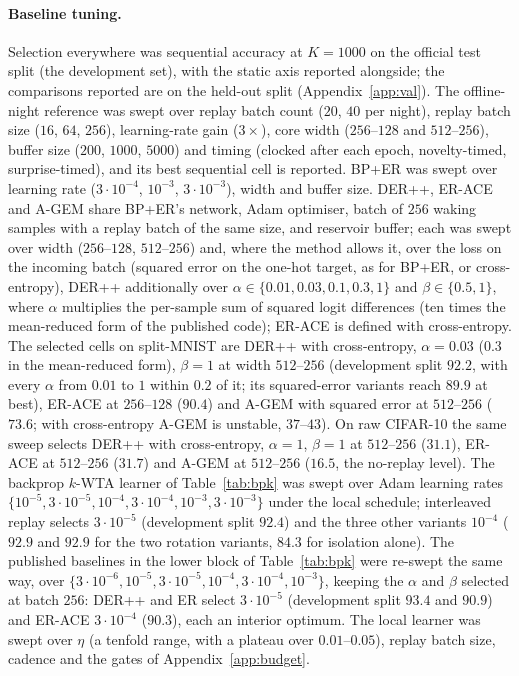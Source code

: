 \documentclass{article}
\newcommand{\kwta}{$k$-WTA}
\begin{document}
\paragraph{Baseline tuning.} Selection everywhere was sequential accuracy at $K{=}1000$ on
the official test split (the development set), with the static axis reported alongside; the
comparisons reported are on the held-out split (Appendix~\ref{app:val}). The offline-night
reference was swept over replay batch count ($20$, $40$ per night), replay batch size ($16$,
$64$, $256$), learning-rate gain ($3\times$), core width ($256$--$128$ and $512$--$256$),
buffer size ($200$, $1000$, $5000$) and timing (clocked after each epoch, novelty-timed,
surprise-timed), and its best sequential cell is reported. BP+ER was swept over learning rate
($3{\cdot}10^{-4}$, $10^{-3}$, $3{\cdot}10^{-3}$), width and buffer size. DER++, ER-ACE and
A-GEM share BP+ER's network, Adam optimiser, batch of $256$ waking samples with a replay
batch of the same size, and reservoir buffer; each was swept over width ($256$--$128$,
$512$--$256$) and, where the method allows it, over the loss on the incoming batch (squared
error on the one-hot target, as for BP+ER, or cross-entropy), DER++ additionally over
$\alpha\in\{0.01,0.03,0.1,0.3,1\}$ and $\beta\in\{0.5,1\}$, where $\alpha$ multiplies the
per-sample sum of squared logit differences (ten times the mean-reduced form of the published
code); ER-ACE is defined with cross-entropy. The selected cells on split-MNIST are DER++ with
cross-entropy, $\alpha=0.03$ ($0.3$ in the mean-reduced form), $\beta=1$ at width
$512$--$256$ (development split $92.2$, with every $\alpha$ from $0.01$ to $1$ within $0.2$
of it; its squared-error variants reach $89.9$ at best), ER-ACE at $256$--$128$ ($90.4$) and
A-GEM with
squared error at $512$--$256$ ($73.6$; with cross-entropy A-GEM is unstable, $37$--$43$).
On raw CIFAR-10 the same sweep selects DER++ with cross-entropy, $\alpha=1$, $\beta=1$ at
$512$--$256$ ($31.1$), ER-ACE at $512$--$256$ ($31.7$) and A-GEM at $512$--$256$ ($16.5$,
the no-replay level). The backprop \kwta{} learner of Table~\ref{tab:bpk} was swept over
Adam learning rates $\{10^{-5},3{\cdot}10^{-5},10^{-4},3{\cdot}10^{-4},10^{-3},3{\cdot}10^{-3}\}$
under the local schedule; interleaved replay selects $3{\cdot}10^{-5}$ (development split
$92.4$) and the three other variants $10^{-4}$ ($92.9$ and $92.9$ for the two rotation
variants, $84.3$ for isolation alone). The published baselines in the lower block of
Table~\ref{tab:bpk} were re-swept the same way, over
$\{3{\cdot}10^{-6},10^{-5},3{\cdot}10^{-5},10^{-4},3{\cdot}10^{-4},10^{-3}\}$, keeping the
$\alpha$ and $\beta$ selected at batch $256$: DER++ and ER select $3{\cdot}10^{-5}$
(development split $93.4$ and $90.9$) and ER-ACE $3{\cdot}10^{-4}$ ($90.3$), each an
interior optimum. The local learner was swept over $\eta$ (a tenfold range, with a
plateau over $0.01$--$0.05$), replay batch size, cadence and the gates of
Appendix~\ref{app:budget}.
\end{document}

